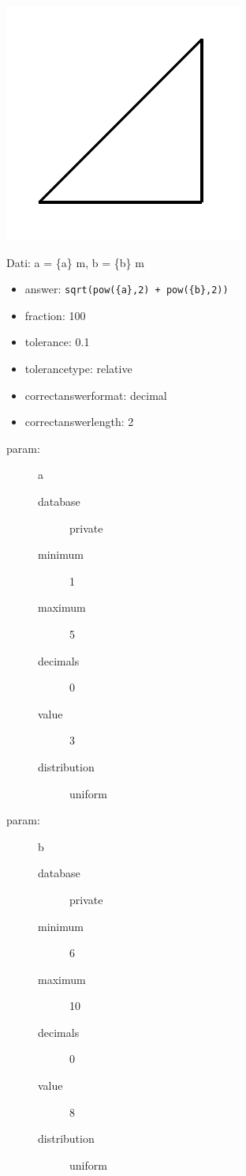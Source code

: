 \documentclass{article}
\begin{document}
\includegraphics[width=0.3\columnwidth]{./img/triangle}

Dati: a = \{a\} m, b = \{b\} m

\begin{itemize}
	\item answer: \texttt{sqrt(pow(\{a\},2) + pow(\{b\},2))}
	\item fraction: 100
	\item tolerance: 0.1
	\item tolerancetype: relative %
	\item correctanswerformat: decimal %
	\item correctanswerlength: 2
\end{itemize}

\begin{description}
	\item[param:] a
	\begin{description}
		\item[database] private  %
		\item[minimum] 1
		\item[maximum] 5
		\item[decimals] 0
		\item[value] 3
		\item[distribution] uniform   %
	\end{description}
	\item[param:] b
	\begin{description}
		\item[database] private  %
		\item[minimum] 6
		\item[maximum] 10
		\item[decimals] 0
		\item[value] 8
		\item[distribution] uniform   %
    \end{description}
\end{description}
\end{document}
